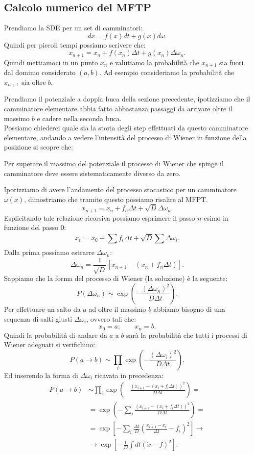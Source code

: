 \subsection{Calcolo numerico del MFTP}%
\label{sub:Calcolo numerico del MFTP}
Prendiamo la SDE per un set di camminatori:
\[
    dx = f(x) dt + g(x) d\omega
.\] 
Quindi per piccoli tempi possiamo scrivere che:
\[
    x_{n+1} = x_n + f(x_n) \Delta t + g(x_n) \Delta\omega_n
.\] 
Quindi mettiamoci in un punto $x_n$ e valutiamo la probabilità che $x_{n+1}$ sia fuori dal dominio considerato $(a,b)$. Ad esempio consideriamo la probabilità che $x_{n+1}$ sia oltre $b$.

Prendiamo il potenziale a doppia buca della sezione precedente, ipotizziamo che il camminatore elementare abbia fatto abbastanza passaggi da arrivare oltre il massimo $b$ e cadere nella seconda buca. \\
Possiamo chiederci quale sia la storia degli step effettuati da questo camminatore elementare, andando a vedere l'intensità del processo di Wiener in funzione della posizione si scopre che:
\begin{redbox}{}
Per superare il massimo del potenziale il processo di Wiener che spinge il camminatore deve essere sistematicamente diverso da zero.
\end{redbox}
\noindent
Ipotizziamo di avere l'andamento del processo stocastico per un camminatore $\omega (x) $, dimostriamo che tramite questo possiamo risalire al MFPT. 
\[
    x_{n+1} = x_n + f_n\Delta t + \sqrt{D}\Delta\omega_n
.\] 
Esplicitando tale relazione ricorsiva possiamo esprimere il passo $n$-esimo in funzione del passo $0$:
\[
    x_n = x_0 + \sum_{}^{} f_i \Delta t + \sqrt{D} \sum_{}^{} \Delta\omega_i
.\] 
Dalla prima possiamo estrarre $\Delta\omega_n$:
\[
    \Delta\omega_n = \frac{1}{\sqrt{D} }\left[x_{n+1}- \left(x_n + f_n \Delta t\right)\right]
.\] 
Sappiamo che la forma del processo di Wiener (la soluzione) è la seguente:
\[
P(\Delta\omega_n) \sim \exp\left(-\frac{\left(\Delta\omega_n\right)^2}{D\Delta t}\right)
.\] 
Per effettuare un salto da $a$ ad oltre il massimo $b$ abbiamo bisogno di una sequenza di salti giusti $\Delta\omega_i$, ovvero tali che:
\[
    x_0=a; \qquad x_n = b
.\] 
Quindi la probabilità di andare da $a$  a $b$ sarà la probabilità che tutti i processi di Wiener adeguati si verifichino:
\[
    P(a\to b) \sim \prod_{i}^{} \exp\left(-\frac{\left(\Delta\omega_i\right)^2}{D\Delta t}\right) 
.\] 
Ed inserendo la forma di $\Delta\omega_i$ ricavata in precedenza:
\[\begin{aligned}
    P(a\to b) &\sim \prod_{i}^{} \exp\left(-\frac{\left( x_{i+1}-(x_i + f_i\Delta t) \right)^2}{D\Delta t}\right) = \\
	      &= \exp\left(-\sum_{i}^{} \frac{\left( x_{i+1}-(x_i + f_i\Delta t) \right)^2}{D\Delta t}\right)=\\
	      &=\exp\left[-\sum_{i}^{} \frac{\Delta t}{D}\left(\frac{ x_{i+1}-x_i}{\Delta t} - f_i \right)^2\right] \to \\
	      & \to \exp\left[ -\frac{1}{D} \int dt \left(\dot{x} - f \right)^2\right]
.\end{aligned}\]
